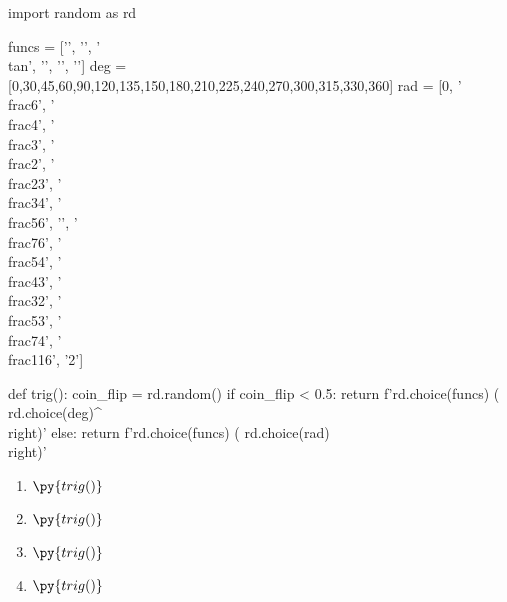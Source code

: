 \documentclass{article}
\begin{document}
\begin{pycode}
import random as rd

funcs = ['\sin', '\cos', '\\tan', '\csc', '\cot', '\sec']
deg = [0,30,45,60,90,120,135,150,180,210,225,240,270,300,315,330,360]
rad = [0, '\\frac{\pi}{6}', '\\frac{\pi}{4}', '\\frac{\pi}{3}', '\\frac{\pi}{2}', 
        '\\frac{2\pi}{3}', '\\frac{3\pi}{4}', '\\frac{5\pi}{6}', '\pi', 
        '\\frac{7\pi}{6}', '\\frac{5\pi}{4}', '\\frac{4\pi}{3}', '\\frac{3\pi}{2}', 
        '\\frac{5\pi}{3}', '\\frac{7\pi}{4}', '\\frac{11\pi}{6}', '2\pi']

def trig():
    coin_flip = rd.random()
    if coin_flip < 0.5:
        return f'{rd.choice(funcs)} \left( {rd.choice(deg)}^\circ \\right)'
    else:
        return f'{rd.choice(funcs)} \left( {rd.choice(rad)} \\right)'
\end{pycode}

\begin{enumerate}
    \item $\py{trig()}$
    \item $\py{trig()}$
    \item $\py{trig()}$
    \item $\py{trig()}$
\end{enumerate}
\end{document}

